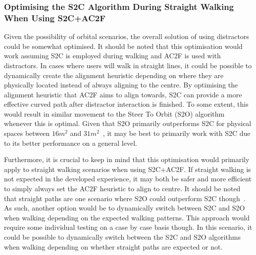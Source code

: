 \subsubsection{Optimising the S2C Algorithm During Straight Walking When Using S2C+AC2F}
Given the possibility of orbital scenarios, the overall solution of using distractors could be somewhat optimised. It should be noted that this optimisation would work assuming S2C is employed during walking and AC2F is used with distractors. In cases where users will walk in straight lines, it could be possible to dynamically create the alignment heuristic depending on where they are physically located instead of always aligning to the centre. By optimising the alignment heuristic that AC2F aims to align towards, S2C can provide a more effective curved path after distractor interaction is finished. To some extent, this would result in similar movement to the Steer To Orbit (S2O) algorithm whenever this is optimal. Given that S2O primarily outperforms S2C for physical spaces between $16m^2$ and $31m^2$~\cite{azmandian2015physical}, it may be best to primarily work with S2C due to its better performance on a general level. 

Furthermore, it is crucial to keep in mind that this optimisation would primarily apply to straight walking scenarios when using S2C+AC2F. If straight walking is not expected in the developed experience, it may both be safer and more efficient to simply always set the AC2F heuristic to align to centre. It should be noted that straight paths are one scenario where S2O could outperform S2C though~\cite{hodgson2013comparing}. As such, another option would be to dynamically switch between S2C and S2O when walking depending on the expected walking patterns. This approach would require some individual testing on a case by case basis though. In this scenario, it could be possible to dynamically switch between the S2C and S2O algorithms when walking depending on whether straight paths are expected or not. 

